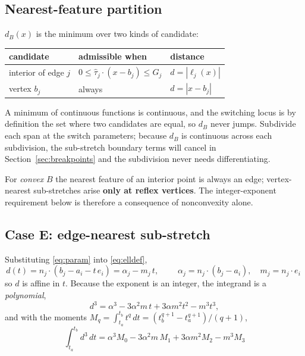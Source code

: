 \documentclass[11pt]{article}
\newcommand{\tauh}{\hat\tau}
\begin{document}
\subsection{Nearest-feature partition}

$d_B(x)$ is the minimum over two kinds of candidate:
\begin{center}
\begin{tabular}{lll}
\hline
candidate & admissible when & distance\\
\hline
interior of edge $j$ & $0\le \tauh_j\cdot(x-b_j)\le G_j$ & $d = |\ell_j(x)|$\\
vertex $b_j$ & always & $d = |x-b_j|$\\
\hline
\end{tabular}
\end{center}
A minimum of continuous functions is continuous, and the switching locus is by definition the set where two candidates are equal, so $d_B$ never jumps. Subdivide each span at the switch parameters; because $d_B$ is continuous across each subdivision, the sub-stretch boundary terms will cancel in Section~\ref{sec:breakpoints} and the subdivision never needs differentiating.

For \emph{convex} $B$ the nearest feature of an interior point is always an edge; vertex-nearest sub-stretches arise \textbf{only at reflex vertices}. The integer-exponent requirement below is therefore a consequence of nonconvexity alone.

\subsection{Case E: edge-nearest sub-stretch}

Substituting \eqref{eq:param} into \eqref{eq:elldef},
\begin{equation}
d(t) = n_j\cdot(b_j - a_i - t\,e_i) = \alpha_j - m_j\,t, \qquad
\boxed{\;\alpha_j = n_j\cdot(b_j-a_i), \quad m_j = n_j\cdot e_i\;}
\label{eq:affine}
\end{equation}
so $d$ is affine in $t$. Because the exponent is an integer, the integrand is a \emph{polynomial},
\begin{equation}
d^3 = \alpha^3 - 3\alpha^2 m\,t + 3\alpha m^2 t^2 - m^3 t^3,
\end{equation}
and with the moments $M_q = \int_{t_a}^{t_b}t^q\,dt = (t_b^{q+1}-t_a^{q+1})/(q+1)$,
\begin{equation}
\boxed{\;\int_{t_a}^{t_b} d^3\,dt = \alpha^3 M_0 - 3\alpha^2 m\,M_1 + 3\alpha m^2 M_2 - m^3 M_3 \;}
\label{eq:Iedge}
\end{equation}
\end{document}
